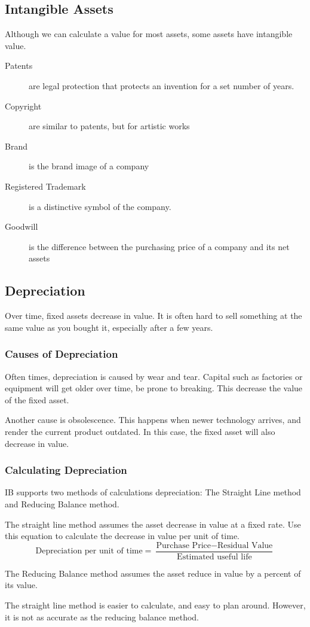 \documentclass{standalone}
\begin{document}
\subsection{Intangible Assets}
Although we can calculate a value for most assets, some assets have intangible value.
\begin{description}
    \item[Patents] are legal protection that protects an invention for a set number of years.
    \item[Copyright] are similar to patents, but for artistic works
    \item[Brand] is the brand image of a company
    \item[Registered Trademark] is a distinctive symbol of the company.
    \item[Goodwill] is the difference between the purchasing price of a company and its net assets
\end{description}

\subsection{Depreciation}
Over time, fixed assets decrease in value.
It is often hard to sell something at the same value as you bought it, especially after a few years.

\subsubsection{Causes of Depreciation}
Often times, depreciation is caused by wear and tear.
Capital such as factories or equipment will get older over time, be prone to breaking.
This decrease the value of the fixed asset.

Another cause is obsolescence.
This happens when newer technology arrives, and render the current product outdated.
In this case, the fixed asset will also decrease in value.

\subsubsection{Calculating Depreciation}
IB supports two methods of calculations depreciation:
The Straight Line method and Reducing Balance method.

The straight line method assumes the asset decrease in value at a fixed rate.
Use this equation to calculate the decrease in value per unit of time.
\begin{equation}
    \textrm{Depreciation per unit of time} = \frac{\textrm{Purchase Price} - \textrm{Residual Value}}{\textrm{Estimated useful life}}
\end{equation}

The Reducing Balance method assumes the asset reduce in value by a percent of its value.

The straight line method is easier to calculate, and easy to plan around.
However, it is not as accurate as the reducing balance method.
\end{document}
